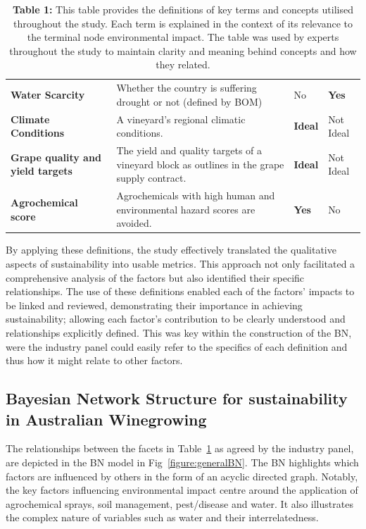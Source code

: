 \documentclass[fleqn,10pt]{wlscirep}
\begin{document}
\begin{table}[h]
\begin{tabular}{@{}llll@{}}
    \textbf{Water Scarcity} & Whether the country is suffering drought or not (defined by BOM) & No & \textbf{Yes} \\
    \textbf{Climate Conditions} & A vineyard's regional climatic conditions. & \textbf{Ideal} & Not Ideal \\
    \textbf{Grape quality and yield targets} & The yield and quality targets of a vineyard block as outlines in the grape supply contract. & \textbf{Ideal} & Not Ideal \\
    \textbf{Agrochemical score} & Agrochemicals with high human and environmental hazard scores are avoided. & \textbf{Yes} & No \\ \bottomrule
    \end{tabular}
    \caption{\textbf{Table 1:} This table provides the definitions of key terms and concepts utilised throughout the study. Each term is explained in the context of its relevance to the terminal node environmental impact. The table was used by experts throughout the study to maintain clarity and meaning behind concepts and how they related.}\label{tab:definitions}
\end{table}

By applying these definitions, the study effectively translated the qualitative aspects of sustainability into usable metrics. This approach not only facilitated a comprehensive analysis of the factors but also identified their specific relationships. The use of these definitions enabled each of the factors' impacts to be linked and reviewed, demonstrating their importance in achieving sustainability; allowing each factor's contribution to be clearly understood and relationships explicitly defined. This was key within the construction of the BN, were the industry panel could easily refer to the specifics of each definition and thus how it might relate to other factors.

\subsection*{Bayesian Network Structure for sustainability in Australian Winegrowing}

The relationships between the facets in Table~\ref{tab:definitions}  as agreed by the industry panel, are depicted in the BN model in Fig~\ref{figure:generalBN}. The BN highlights which factors are influenced by others in the form of an acyclic directed graph. Notably, the key factors influencing environmental impact centre around the application of agrochemical sprays, soil management, pest/disease and water. It also illustrates the complex nature of variables such as water and their interrelatedness.
\end{document}
